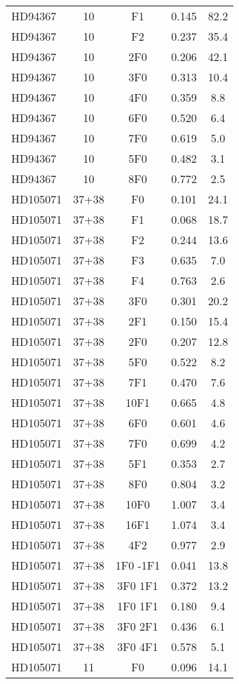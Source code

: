 \begin{table*}
\begin{tabular}{l c c c c}
HD94367 & 10 & F1 & 0.145 & 82.2\\ 
HD94367 & 10 & F2 & 0.237 & 35.4\\ 
HD94367 & 10 & 2F0 & 0.206 & 42.1\\ 
HD94367 & 10 & 3F0 & 0.313 & 10.4\\ 
HD94367 & 10 & 4F0 & 0.359 & 8.8\\ 
HD94367 & 10 & 6F0 & 0.520 & 6.4\\ 
HD94367 & 10 & 7F0 & 0.619 & 5.0\\ 
HD94367 & 10 & 5F0 & 0.482 & 3.1\\ 
HD94367 & 10 & 8F0 & 0.772 & 2.5\\ 
\hline
HD105071 & 37+38 & F0 & 0.101 & 24.1\\ 
HD105071 & 37+38 & F1 & 0.068 & 18.7\\ 
HD105071 & 37+38 & F2 & 0.244 & 13.6\\ 
HD105071 & 37+38 & F3 & 0.635 & 7.0\\ 
HD105071 & 37+38 & F4 & 0.763 & 2.6\\ 
HD105071 & 37+38 & 3F0 & 0.301 & 20.2\\ 
HD105071 & 37+38 & 2F1 & 0.150 & 15.4\\ 
HD105071 & 37+38 & 2F0 & 0.207 & 12.8\\ 
HD105071 & 37+38 & 5F0 & 0.522 & 8.2\\ 
HD105071 & 37+38 & 7F1 & 0.470 & 7.6\\ 
HD105071 & 37+38 & 10F1 & 0.665 & 4.8\\ 
HD105071 & 37+38 & 6F0 & 0.601 & 4.6\\ 
HD105071 & 37+38 & 7F0 & 0.699 & 4.2\\ 
HD105071 & 37+38 & 5F1 & 0.353 & 2.7\\ 
HD105071 & 37+38 & 8F0 & 0.804 & 3.2\\ 
HD105071 & 37+38 & 10F0 & 1.007 & 3.4\\ 
HD105071 & 37+38 & 16F1 & 1.074 & 3.4\\ 
HD105071 & 37+38 & 4F2 & 0.977 & 2.9\\ 
HD105071 & 37+38 & 1F0 -1F1 & 0.041 & 13.8\\ 
HD105071 & 37+38 & 3F0 1F1 & 0.372 & 13.2\\ 
HD105071 & 37+38 & 1F0 1F1 & 0.180 & 9.4\\ 
HD105071 & 37+38 & 3F0 2F1 & 0.436 & 6.1\\ 
HD105071 & 37+38 & 3F0 4F1 & 0.578 & 5.1\\ 
\hline
HD105071 & 11 & F0 & 0.096 & 14.1\\ 

\end{tabular}
\end{table*}
